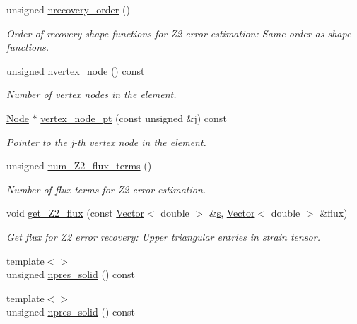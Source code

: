 \begin{DoxyCompactItemize}
unsigned \hyperlink{classoomph_1_1TPVDElementWithContinuousPressure_ad2fac6714b3a38e66c4e2e837870cff7}{nrecovery\+\_\+order} ()
\begin{DoxyCompactList}\small\item\em Order of recovery shape functions for Z2 error estimation\+: Same order as shape functions. \end{DoxyCompactList}\item 
unsigned \hyperlink{classoomph_1_1TPVDElementWithContinuousPressure_a3be09b442e13efa2e91f936e59034670}{nvertex\+\_\+node} () const
\begin{DoxyCompactList}\small\item\em Number of vertex nodes in the element. \end{DoxyCompactList}\item 
\hyperlink{classoomph_1_1Node}{Node} $\ast$ \hyperlink{classoomph_1_1TPVDElementWithContinuousPressure_a24200726cc04eec0150070d8a223ae8f}{vertex\+\_\+node\+\_\+pt} (const unsigned \&j) const
\begin{DoxyCompactList}\small\item\em Pointer to the j-\/th vertex node in the element. \end{DoxyCompactList}\item 
unsigned \hyperlink{classoomph_1_1TPVDElementWithContinuousPressure_a58c787ae0839874b13611b75c37863f7}{num\+\_\+\+Z2\+\_\+flux\+\_\+terms} ()
\begin{DoxyCompactList}\small\item\em Number of \textquotesingle{}flux\textquotesingle{} terms for Z2 error estimation. \end{DoxyCompactList}\item 
void \hyperlink{classoomph_1_1TPVDElementWithContinuousPressure_ad86fa95c068d3ae0735729e42f5fe3c1}{get\+\_\+\+Z2\+\_\+flux} (const \hyperlink{classoomph_1_1Vector}{Vector}$<$ double $>$ \&\hyperlink{cfortran_8h_ab7123126e4885ef647dd9c6e3807a21c}{s}, \hyperlink{classoomph_1_1Vector}{Vector}$<$ double $>$ \&flux)
\begin{DoxyCompactList}\small\item\em Get \textquotesingle{}flux\textquotesingle{} for Z2 error recovery\+: Upper triangular entries in strain tensor. \end{DoxyCompactList}\item 
{\footnotesize template$<$$>$ }\\unsigned \hyperlink{classoomph_1_1TPVDElementWithContinuousPressure_a8c72c90b0a9fbf199683bf46cdc7116f}{npres\+\_\+solid} () const
\item 
{\footnotesize template$<$$>$ }\\unsigned \hyperlink{classoomph_1_1TPVDElementWithContinuousPressure_ad79413ff3f46e433ce6d8946b7378dca}{npres\+\_\+solid} () const
\end{DoxyCompactItemize}
